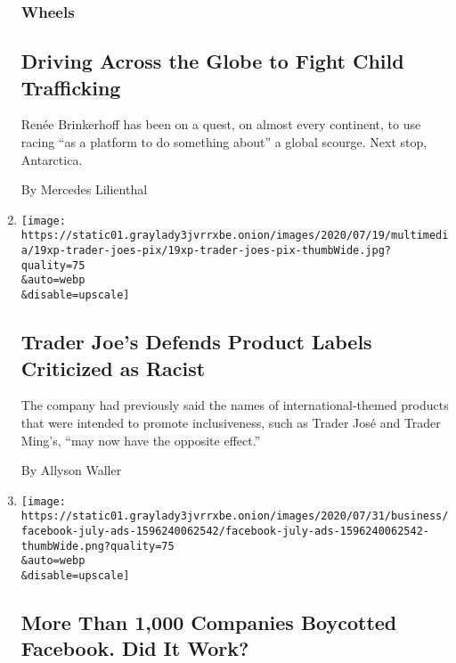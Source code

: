 \begin{enumerate}
  \hypertarget{wheels}{%
  \subsubsection{Wheels}\label{wheels}}

  \hypertarget{driving-across-the-globe-to-fight-child-trafficking}{%
  \subsection{Driving Across the Globe to Fight Child
  Trafficking}\label{driving-across-the-globe-to-fight-child-trafficking}}

  Renée Brinkerhoff has been on a quest, on almost every continent, to
  use racing ``as a platform to do something about'' a global scourge.
  Next stop, Antarctica.

  By Mercedes Lilienthal
\item
  \href{/2020/08/01/us/trader-joes-jose-ming-joe-san.html}{}

  \texttt{[image: https://static01.graylady3jvrrxbe.onion/images/2020/07/19/multimedia/19xp-trader-joes-pix/19xp-trader-joes-pix-thumbWide.jpg?quality=75\\\&auto=webp\\\&disable=upscale]}

  \hypertarget{trader-joes-defends-product-labels-criticized-as-racist}{%
  \subsection{Trader Joe's Defends Product Labels Criticized as
  Racist}\label{trader-joes-defends-product-labels-criticized-as-racist}}

  The company had previously said the names of international-themed
  products that were intended to promote inclusiveness, such as Trader
  José and Trader Ming's, ``may now have the opposite effect.''

  By Allyson Waller
\item
  \href{/2020/08/01/business/media/facebook-boycott.html}{}

  \texttt{[image: https://static01.graylady3jvrrxbe.onion/images/2020/07/31/business/facebook-july-ads-1596240062542/facebook-july-ads-1596240062542-thumbWide.png?quality=75\\\&auto=webp\\\&disable=upscale]}

  \hypertarget{more-than-1000-companies-boycotted-facebook-did-it-work}{%
  \subsection{More Than 1,000 Companies Boycotted Facebook. Did It
  Work?}\label{more-than-1000-companies-boycotted-facebook-did-it-work}}


\end{enumerate}
